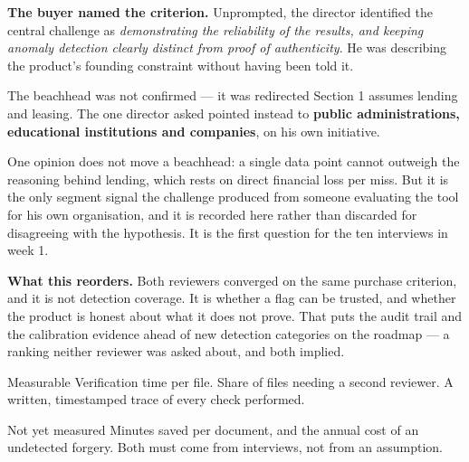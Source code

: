 \documentclass[10pt,a4paper]{article}
\newcommand{\heading}[2]{%
  \par\vspace{12pt}{\color{navy}\bfseries #1\hspace{6pt}#2}\par\vspace{-2pt}}
\newcommand{\fld}[1]{\textbf{\color{navy}#1}\hspace{5pt}}
\begin{document}
\fld{The buyer named the criterion.} Unprompted, the director identified the
central challenge as \emph{demonstrating the reliability of the results, and
keeping anomaly detection clearly distinct from proof of authenticity}. He was
describing the product's founding constraint without having been told it.

\vspace{4pt}
\begin{note}{The beachhead was not confirmed --- it was redirected}
Section 1 assumes lending and leasing. The one director asked pointed instead to
\textbf{public administrations, educational institutions and companies}, on his
own initiative.

\vspace{3pt}
One opinion does not move a beachhead: a single data point cannot outweigh the
reasoning behind lending, which rests on direct financial loss per miss. But it
is the only segment signal the challenge produced from someone evaluating the
tool for his own organisation, and it is recorded here rather than discarded for
disagreeing with the hypothesis. It is the first question for the ten interviews
in week 1.
\end{note}

\vspace{4pt}
\fld{What this reorders.} Both reviewers converged on the same purchase
criterion, and it is not detection coverage. It is whether a flag can be
trusted, and whether the product is honest about what it does not prove. That
puts the audit trail and the calibration evidence ahead of new detection
categories on the roadmap --- a ranking neither reviewer was asked about, and
both implied.

\heading{3.}{Value --- what is actually being bought}

\begin{minipage}[t]{0.485\linewidth}
\begin{goodbox}{Measurable}
Verification time per file. Share of files needing a second reviewer. A written,
timestamped trace of every check performed.
\end{goodbox}
\end{minipage}\hfill
\begin{minipage}[t]{0.485\linewidth}
\begin{badbox}{Not yet measured}
Minutes saved per document, and the annual cost of an undetected forgery. Both
must come from interviews, not from an assumption.
\end{badbox}
\end{minipage}
\end{document}
